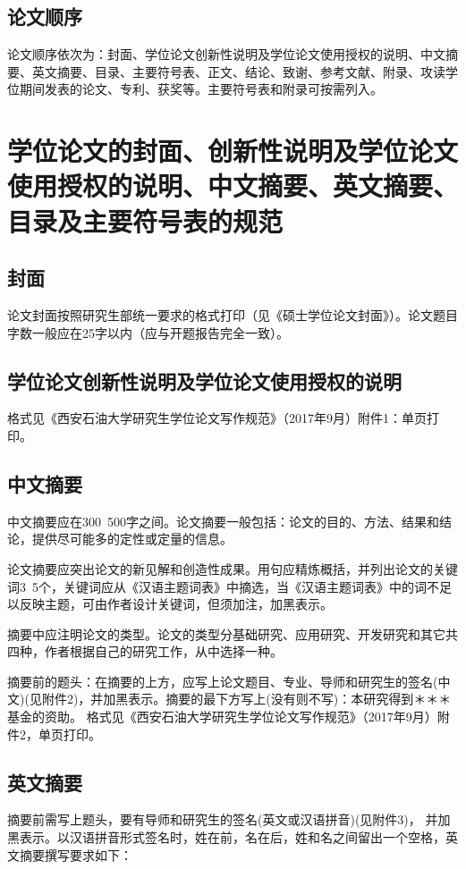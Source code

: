 \subsection{论文顺序}
论文顺序依次为：封面、学位论文创新性说明及学位论文使用授权的说明、中文摘要、英文摘要、目录、主要符号表、正文、结论、致谢、参考文献、附录、攻读学位期间发表的论文、专利、获奖等。主要符号表和附录可按需列入。

\section{学位论文的封面、创新性说明及学位论文使用授权的说明、中文摘要、英文摘要、目录及主要符号表的规范}
\subsection{封面}
论文封面按照研究生部统一要求的格式打印（见《硕士学位论文封面》）。论文题目字数一般应在25字以内（应与开题报告完全一致）。
\subsection{学位论文创新性说明及学位论文使用授权的说明}
格式见《西安石油大学研究生学位论文写作规范》（2017年9月）附件1：单页打印。
\subsection{中文摘要}
中文摘要应在300~500字之间。论文摘要一般包括：论文的目的、方法、结果和结论，提供尽可能多的定性或定量的信息。

论文摘要应突出论文的新见解和创造性成果。用句应精炼概括，并列出论文的关键词3~5个，关键词应从《汉语主题词表》中摘选，当《汉语主题词表》中的词不足以反映主题，可由作者设计关键词，但须加注，加黑表示。

摘要中应注明论文的类型。论文的类型分基础研究、应用研究、开发研究和其它共四种，作者根据自己的研究工作，从中选择一种。

摘要前的题头：在摘要的上方，应写上论文题目、专业、导师和研究生的签名(中文)(见附件2)，并加黑表示。摘要的最下方写上(没有则不写)：本研究得到＊＊＊基金的资助。
格式见《西安石油大学研究生学位论文写作规范》（2017年9月）附件2，单页打印。

\subsection{英文摘要}
摘要前需写上题头，要有导师和研究生的签名(英文或汉语拼音)(见附件3)， 并加黑表示。以汉语拼音形式签名时，姓在前，名在后，姓和名之间留出一个空格，英文摘要撰写要求如下：

